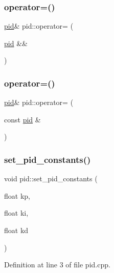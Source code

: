 \subsubsection{\texorpdfstring{operator=()}{operator=()}\hspace{0.1cm}{\footnotesize\ttfamily [1/2]}}
{\footnotesize\ttfamily \mbox{\hyperlink{classpid}{pid}}\& pid\+::operator= (\begin{DoxyParamCaption}\item[{\mbox{\hyperlink{classpid}{pid}} \&\&}]{ }\end{DoxyParamCaption})\hspace{0.3cm}{\ttfamily [default]}}

\mbox{\label{classpid_ab3bc80b44e04ee45b20138cd54c59e36}} 
\subsubsection{\texorpdfstring{operator=()}{operator=()}\hspace{0.1cm}{\footnotesize\ttfamily [2/2]}}
{\footnotesize\ttfamily \mbox{\hyperlink{classpid}{pid}}\& pid\+::operator= (\begin{DoxyParamCaption}\item[{const \mbox{\hyperlink{classpid}{pid}} \&}]{ }\end{DoxyParamCaption})\hspace{0.3cm}{\ttfamily [default]}}

\mbox{\label{classpid_a345ce01f84470d635660b342770dce7c}} 
\subsubsection{\texorpdfstring{set\_pid\_constants()}{set\_pid\_constants()}}
{\footnotesize\ttfamily void pid\+::set\+\_\+pid\+\_\+constants (\begin{DoxyParamCaption}\item[{float}]{kp,  }\item[{float}]{ki,  }\item[{float}]{kd }\end{DoxyParamCaption})}



Definition at line 3 of file pid.\+cpp.

